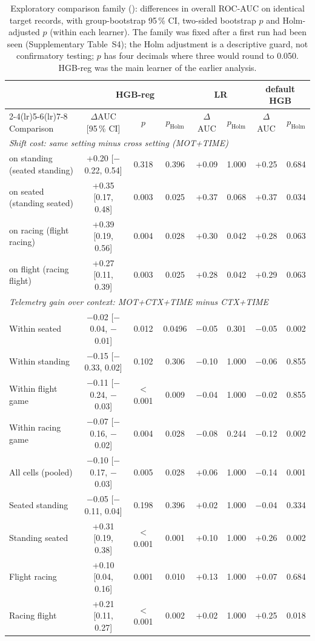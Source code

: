 \begin{table}[t]
\centering
\footnotesize
\caption{Exploratory comparison family (\sevtwo{}): differences in overall ROC-AUC on identical target records, with group-bootstrap 95\,\% CI, two-sided bootstrap $p$ and Holm-adjusted $p$ (within each learner). The family was fixed after a first run had been seen (Supplementary Table~S4); the Holm adjustment is a descriptive guard, not confirmatory testing; $p$ has four decimals where three would round to 0.050. HGB-reg was the main learner of the earlier analysis.}
\label{tab:tests}
\setlength{\tabcolsep}{3pt}
\begin{tabular}{@{}lccccccc@{}}
\toprule
 & \multicolumn{3}{c}{HGB-reg} & \multicolumn{2}{c}{LR} & \multicolumn{2}{c}{default HGB} \\ \cmidrule(lr){2-4}\cmidrule(lr){5-6}\cmidrule(lr){7-8}
Comparison & $\Delta$AUC [95\,\% CI] & $p$ & $p_\mathrm{Holm}$ & $\Delta$AUC & $p_\mathrm{Holm}$ & $\Delta$AUC & $p_\mathrm{Holm}$ \\
\midrule
\multicolumn{8}{l}{\emph{Shift cost: same setting minus cross setting (MOT+TIME)}} \\
on standing (seated \ra{} standing) & +0.20 [$-$0.22, 0.54] & 0.318 & 0.396 & +0.09 & 1.000 & +0.25 & 0.684 \\
on seated (standing \ra{} seated) & +0.35 [0.17, 0.48] & 0.003 & 0.025 & +0.37 & 0.068 & +0.37 & 0.034 \\
on racing (flight \ra{} racing) & +0.39 [0.19, 0.56] & 0.004 & 0.028 & +0.30 & 0.042 & +0.28 & 0.063 \\
on flight (racing \ra{} flight) & +0.27 [0.11, 0.39] & 0.003 & 0.025 & +0.28 & 0.042 & +0.29 & 0.063 \\
\multicolumn{8}{l}{\emph{Telemetry gain over context: MOT+CTX+TIME minus CTX+TIME}} \\
Within seated & $-$0.02 [$-$0.04, $-$0.01] & 0.012 & 0.0496 & $-$0.05 & 0.301 & $-$0.05 & 0.002 \\
Within standing & $-$0.15 [$-$0.33, 0.02] & 0.102 & 0.306 & $-$0.10 & 1.000 & $-$0.06 & 0.855 \\
Within flight game & $-$0.11 [$-$0.24, $-$0.03] & $<$0.001 & 0.009 & $-$0.04 & 1.000 & $-$0.02 & 0.855 \\
Within racing game & $-$0.07 [$-$0.16, $-$0.02] & 0.004 & 0.028 & $-$0.08 & 0.244 & $-$0.12 & 0.002 \\
All cells (pooled) & $-$0.10 [$-$0.17, $-$0.03] & 0.005 & 0.028 & +0.06 & 1.000 & $-$0.14 & 0.001 \\
Seated \ra{} standing & $-$0.05 [$-$0.11, 0.04] & 0.198 & 0.396 & +0.02 & 1.000 & $-$0.04 & 0.334 \\
Standing \ra{} seated & +0.31 [0.19, 0.38] & $<$0.001 & 0.001 & +0.10 & 1.000 & +0.26 & 0.002 \\
Flight \ra{} racing & +0.10 [0.04, 0.16] & 0.001 & 0.010 & +0.13 & 1.000 & +0.07 & 0.684 \\
Racing \ra{} flight & +0.21 [0.11, 0.27] & $<$0.001 & 0.002 & +0.02 & 1.000 & +0.25 & 0.018 \\
\bottomrule
\end{tabular}
\end{table}